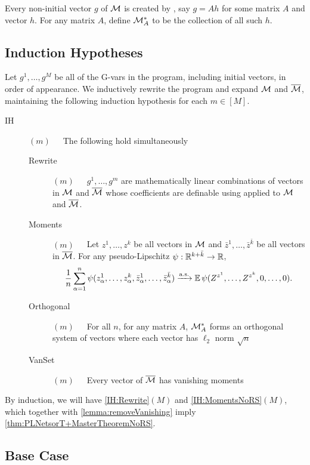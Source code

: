 \documentclass[main.tex]{subfiles}
\begin{document}
Every non-initial vector $g$ of $\mathcal{M}$ is created by , say $g=Ah$ for some matrix $A$ and vector $h$. For any matrix $A$, define $\mathcal{M}_{A}^{*}$ to be the collection of all such $h$.

\subsection{Induction Hypotheses}

Let $g^{1},\ldots,g^{M}$ be all of the G-vars in the program, including initial vectors, in order of appearance. We inductively rewrite the program and expand $\mathcal{M}$ and $\overline{\mathcal{M}}$, maintaining the following induction hypothesis for each $m\in[M]$.
\begin{description}
\item [IH\label{IH:NoRS}]\!\!\!$(m)$\ \ \ 
  The following hold simultaneously
  \begin{description}
  \item [Rewrite\label{IH:Rewrite}]\!\!\!$(m)$\ \ \ 
    $g^{1},\ldots,g^{m}$ are mathematically linear combinations of vectors in $\mathcal{M}$ and $\overline{\mathcal{M}}$ whose coefficients are definable using  applied to $\mathcal{M}$ and $\overline{\mathcal{M}}$.
  \item [Moments\label{IH:MomentsNoRS}]\!\!\!$(m)$\ \ \ 
    Let $z^{1},\ldots,z^{k}$ be all vectors in $\mathcal{M}$ and $\bar{z}^{1},\ldots,\bar{z}^{\bar{k}}$ be all vectors in $\overline{\mathcal{M}}$. For any pseudo-Lipschitz $\psi:\mathbb{R}^{k+\bar{k}}\to\mathbb{R}$,
  \[
  \frac{1}{n}\sum_{\alpha=1}^{n}\psi(z_{\alpha}^{1},\ldots,z_{\alpha}^{k},\bar{z}_{\alpha}^{1},\ldots,\bar{z}_{\alpha}^{\bar{k}})\xrightarrow{\mathrm{a.s.}}\operatorname*{\mathbb{E}}\psi(Z^{z^{1}},\ldots,Z^{z^{k}},0,\ldots,0).
  \]
  \item [Orthogonal\label{IH:Orthogonal}]\!\!\!$(m)$\ \ \ 
    For all $n$, for any matrix $A$, $\mathcal{M}_{A}^{*}$ forms an orthogonal system of vectors where each vector has $\ell_{2}$ norm $\sqrt{n}$
  \item [VanSet\label{IH:Vanset}]\!\!\!$(m)$\ \ \ 
    Every vector of $\overline{\mathcal{M}}$ has vanishing moments
  \end{description}
\end{description}
By induction, we will have \ref{IH:Rewrite}$(M)$ and \ref{IH:MomentsNoRS}$(M)$, which together with \cref{lemma:removeVanishing} imply \cref{thm:PLNetsorT+MasterTheoremNoRS}.

\subsection{Base Case}
\end{document}
